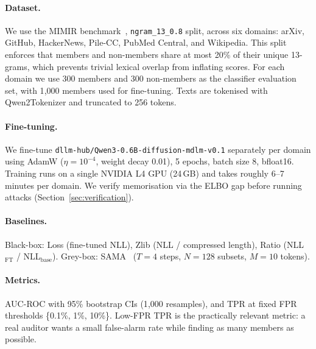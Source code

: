 \paragraph{Dataset.}
We use the MIMIR benchmark~\citep{duan2024mimir}, \texttt{ngram\_13\_0.8} split,
across six domains: arXiv, GitHub, HackerNews, Pile-CC, PubMed Central, and Wikipedia.
This split enforces that members and non-members share at most 20\% of their unique
13-grams, which prevents trivial lexical overlap from inflating scores.
For each domain we use 300 members and 300 non-members as the classifier evaluation set,
with 1{,}000 members used for fine-tuning. Texts are tokenised with Qwen2Tokenizer
and truncated to 256 tokens.

\paragraph{Fine-tuning.}
We fine-tune \texttt{dllm-hub/Qwen3-0.6B-diffusion-mdlm-v0.1} separately per domain
using AdamW ($\eta = 10^{-4}$, weight decay 0.01), 5 epochs, batch size 8, bfloat16.
Training runs on a single NVIDIA L4 GPU (24\,GB) and takes roughly 6--7 minutes per domain.
We verify memorisation via the ELBO gap before running attacks (Section~\ref{sec:verification}).

\paragraph{Baselines.}
Black-box: Loss (fine-tuned NLL), Zlib (NLL / compressed length),
Ratio (NLL$_\mathrm{FT}$ / NLL$_\mathrm{base}$).
Grey-box: SAMA~\citep{shi2025sama} ($T=4$ steps, $N=128$ subsets, $M=10$ tokens).

\paragraph{Metrics.}
AUC-ROC with 95\% bootstrap CIs (1{,}000 resamples), and TPR at fixed FPR thresholds
\{0.1\%, 1\%, 10\%\}. Low-FPR TPR is the practically relevant metric:
a real auditor wants a small false-alarm rate while finding as many members as possible.
